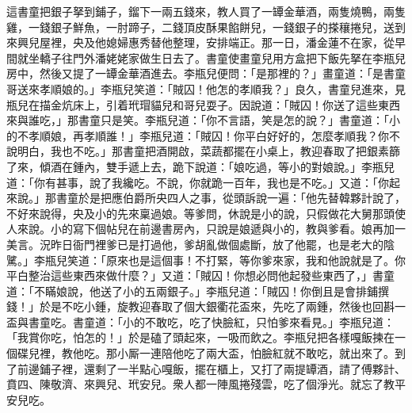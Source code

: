 這書童把銀子拏到鋪子，鎦下一兩五錢來，教人買了一罈金華酒，兩隻燒鴨，兩隻雞，一錢銀子鮮魚，一肘蹄子，二錢頂皮酥果餡餅兒，一錢銀子的搽穰捲兒，送到來興兒屋裡，央及他媳婦惠秀替他整理，安排端正。那一日，潘金蓮不在家，從早間就坐轎子往門外潘姥姥家做生日去了。書童使畫童兒用方盒把下飯先拏在李瓶兒房中，然後又提了一罈金華酒進去。李瓶兒便問：「是那裡的？」畫童道：「是書童哥送來孝順娘的。」李瓶兒笑道：「賊囚！他怎的孝順我？」良久，書童兒進來，見瓶兒在描金炕床上，引着玳瑁貓兒和哥兒耍子。因說道：「賊囚！你送了這些東西來與誰吃，」那書童只是笑。李瓶兒道：「你不言語，笑是怎的說？」書童道：「小的不孝順娘，再孝順誰！」{}李瓶兒道：「賊囚！你平白好好的，怎麼孝順我？你不說明白，我也不吃。」那書童把酒開啟，菜蔬都擺在小桌上，教迎春取了把銀素篩了來，傾酒在鍾內，雙手遞上去，跪下說道：「娘吃過，等小的對娘說。」李瓶兒道：「你有甚事，說了我纔吃。不說，你就跪一百年，我也是不吃。」又道：「你起來說。」那書童於是把應伯爵所央四人之事，從頭訴說一遍：「他先替韓夥計說了，不好來說得，央及小的先來稟過娘。等爹問，休說是小的說，只假做花大舅那頭使人來說。小的寫下個帖兒在前邊書房內，只說是娘遞與小的，教與爹看。娘再加一美言。況昨日衙門裡爹已是打過他，爹胡亂做個處斷，放了他罷，也是老大的陰騭。」李瓶兒笑道：「原來也是這個事！不打緊，等你爹來家，我和他說就是了。你平白整治這些東西來做什麼？」又道：「賊囚！你想必問他起發些東西了，」書童道：「不瞞娘說，他送了小的五兩銀子。」李瓶兒道：「賊囚！你倒且是會排鋪撰錢！」於是不吃小鍾，旋教迎春取了個大銀衢花盃來，先吃了兩鍾，然後也回斟一盃與書童吃。書童道：「小的不敢吃，吃了快臉紅，只怕爹來看見。」李瓶兒道：「我賞你吃，怕怎的！」於是磕了頭起來，一吸而飲之。李瓶兒把各樣嘎飯揀在一個碟兒裡，教他吃。那小厮一連陪他吃了兩大盃，怕臉紅就不敢吃，就出來了。到了前邊鋪子裡，還剩了一半點心嘎飯，擺在櫃上，又打了兩提罈酒，請了傅夥計、賁四、陳敬濟、來興兒、玳安兒。衆人都一陣風捲殘雲，吃了個淨光。就忘了教平安兒吃。

